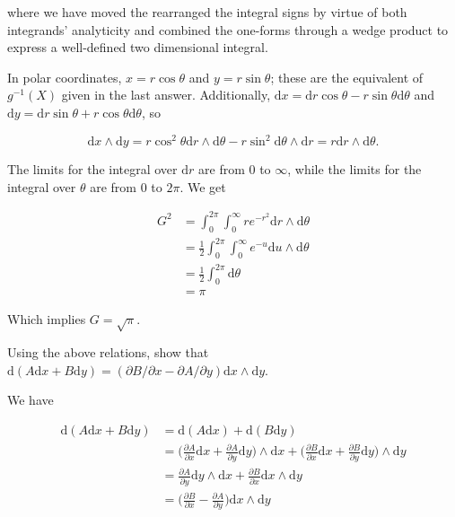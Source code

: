 \documentclass[../the-road-to-reality.tex]{subfiles}
\begin{document}
\begin{questions}
\begin{solution}
        where we have moved the rearranged the integral signs by virtue of both integrands' analyticity and combined the one-forms through a wedge product to express a well-defined two dimensional integral.

        In polar coordinates, $x = r\cos\theta$ and $y = r\sin\theta$; these are the equivalent of $g^{-1}(X)$ given in the last answer. Additionally, $\mathrm{d}x = \mathrm{d}r\cos\theta - r\sin\theta\mathrm{d}\theta$ and $\mathrm{d}y = \mathrm{d}r\sin\theta + r\cos\theta\mathrm{d}\theta$, so

	\[
	\mathrm{d}x \wedge \mathrm{d}y = r\cos^2\theta\mathrm{d}r\wedge\mathrm{d}\theta - r\sin^2\mathrm{d}\theta\wedge\mathrm{d}r = r\mathrm{d}r\wedge\mathrm{d}\theta
	.\] 

        The limits for the integral over $\mathrm{d}r$ are from $0$ to $\infty$, while the limits for the integral over $\theta$ are from $0$ to $2\pi$. We get

        \begin{align*}
                G^2 &= \int_0^{2\pi}\int_0^{\infty}re^{-r^2}\mathrm{d}r\wedge\mathrm{d}\theta \\
                &= \frac{1}{2}\int_0^{2\pi}\int_0^{\infty}e^{-u}\mathrm{d}u\wedge\mathrm{d}\theta \\
                &= \frac{1}{2}\int_0^{2\pi}\mathrm{d}\theta \\
                &= \pi
        \end{align*}

        Which implies $G = \sqrt{\pi}$.
\end{solution}

\question Using the above relations, show that $\mathrm{d}(A\mathrm{d}x + B\mathrm{d}y) = (\partial{B}/\partial{x} - \partial{A}/\partial{y})\mathrm{d}x\wedge\mathrm{d}y$.

\begin{solution}
        We have

        \begin{align*}
                \mathrm{d}(A\mathrm{d}x + B\mathrm{d}y) &= \mathrm{d}(A\mathrm{d}x) + \mathrm{d}(B\mathrm{d}y) \\
                &= \Big(\frac{\partial{A}}{\partial{x}}\mathrm{d}x + \frac{\partial{A}}{\partial{y}}\mathrm{d}y\Big)\wedge\mathrm{d}x + \Big(\frac{\partial{B}}{\partial{x}}\mathrm{d}x + \frac{\partial{B}}{\partial{y}}\mathrm{d}y\Big)\wedge\mathrm{d}y \\
                &= \frac{\partial{A}}{\partial{y}}\mathrm{d}y\wedge\mathrm{d}x + \frac{\partial{B}}{\partial{x}}\mathrm{d}x\wedge\mathrm{d}y \\
                &= \Big(\frac{\partial{B}}{\partial{x}} - \frac{\partial{A}}{\partial{y}}\Big)\mathrm{d}x\wedge\mathrm{d}y
        \end{align*}
\end{solution}


\end{questions}
\end{document}
